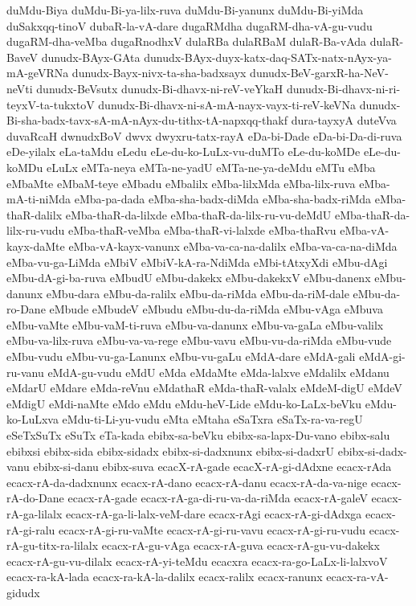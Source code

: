 {duMdu-Biya
duMdu-Bi-ya-lilx-ruva
duMdu-Bi-yanunx
duMdu-Bi-yiMda
duSakxqq-tinoV
dubaR-la-vA-dare
dugaRMdha
dugaRM-dha-vA-gu-vudu
dugaRM-dha-veMba
dugaRnodhxV
dulaRBa
dulaRBaM
dulaR-Ba-vAda
dulaR-BaveV
dunudx-BAyx-GAta
dunudx-BAyx-duyx-katx-daq-SATx-natx-nAyx-ya-mA-geVRNa
dunudx-Bayx-nivx-ta-sha-badxsayx
dunudx-BeV-garxR-ha-NeV-neVti
dunudx-BeVsutx
dunudx-Bi-dhavx-ni-reV-veYkaH
dunudx-Bi-dhavx-ni-ri-teyxV-ta-tukxtoV
dunudx-Bi-dhavx-ni-sA-mA-nayx-vayx-ti-reV-keVNa
dunudx-Bi-sha-badx-tavx-sA-mA-nAyx-du-tithx-tA-napxqq-thakf
dura-tayxyA
duteVva
duvaRcaH
dwnudxBoV
dwvx
dwyxru-tatx-rayA
eDa-bi-Dade
eDa-bi-Da-di-ruva
eDe-yilalx
eLa-taMdu
eLedu
eLe-du-ko-LuLx-vu-duMTo
eLe-du-koMDe
eLe-du-koMDu
eLuLx
eMTa-neya
eMTa-ne-yadU
eMTa-ne-ya-deMdu
eMTu
eMba
eMbaMte
eMbaM-teye
eMbadu
eMbalilx
eMba-lilxMda
eMba-lilx-ruva
eMba-mA-ti-niMda
eMba-pa-dada
eMba-sha-badx-diMda
eMba-sha-badx-riMda
eMba-thaR-dalilx
eMba-thaR-da-lilxde
eMba-thaR-da-lilx-ru-vu-deMdU
eMba-thaR-da-lilx-ru-vudu
eMba-thaR-veMba
eMba-thaR-vi-lalxde
eMba-thaRvu
eMba-vA-kayx-daMte
eMba-vA-kayx-vanunx
eMba-va-ca-na-dalilx
eMba-va-ca-na-diMda
eMba-vu-ga-LiMda
eMbiV
eMbiV-kA-ra-NdiMda
eMbi-tAtxyXdi
eMbu-dAgi
eMbu-dA-gi-ba-ruva
eMbudU
eMbu-dakekx
eMbu-dakekxV
eMbu-danenx
eMbu-danunx
eMbu-dara
eMbu-da-ralilx
eMbu-da-riMda
eMbu-da-riM-dale
eMbu-da-ro-Dane
eMbude
eMbudeV
eMbudu
eMbu-du-da-riMda
eMbu-vAga
eMbuva
eMbu-vaMte
eMbu-vaM-ti-ruva
eMbu-va-danunx
eMbu-va-gaLa
eMbu-valilx
eMbu-va-lilx-ruva
eMbu-va-va-rege
eMbu-vavu
eMbu-vu-da-riMda
eMbu-vude
eMbu-vudu
eMbu-vu-ga-Lanunx
eMbu-vu-gaLu
eMdA-dare
eMdA-gali
eMdA-gi-ru-vanu
eMdA-gu-vudu
eMdU
eMda
eMdaMte
eMda-lalxve
eMdalilx
eMdanu
eMdarU
eMdare
eMda-reVnu
eMdathaR
eMda-thaR-valalx
eMdeM-digU
eMdeV
eMdigU
eMdi-naMte
eMdo
eMdu
eMdu-heV-Lide
eMdu-ko-LaLx-beVku
eMdu-ko-LuLxva
eMdu-ti-Li-yu-vudu
eMta
eMtaha
eSaTxra
eSaTx-ra-va-regU
eSeTxSuTx
eSuTx
eTa-kada
ebibx-sa-beVku
ebibx-sa-lapx-Du-vano
ebibx-salu
ebibxsi
ebibx-sida
ebibx-sidadx
ebibx-si-dadxnunx
ebibx-si-dadxrU
ebibx-si-dadx-vanu
ebibx-si-danu
ebibx-suva
ecacX-rA-gade
ecacX-rA-gi-dAdxne
ecacx-rAda
ecacx-rA-da-dadxnunx
ecacx-rA-dano
ecacx-rA-danu
ecacx-rA-da-va-nige
ecacx-rA-do-Dane
ecacx-rA-gade
ecacx-rA-ga-di-ru-va-da-riMda
ecacx-rA-galeV
ecacx-rA-ga-lilalx
ecacx-rA-ga-li-lalx-veM-dare
ecacx-rAgi
ecacx-rA-gi-dAdxga
ecacx-rA-gi-ralu
ecacx-rA-gi-ru-vaMte
ecacx-rA-gi-ru-vavu
ecacx-rA-gi-ru-vudu
ecacx-rA-gu-titx-ra-lilalx
ecacx-rA-gu-vAga
ecacx-rA-guva
ecacx-rA-gu-vu-dakekx
ecacx-rA-gu-vu-dilalx
ecacx-rA-yi-teMdu
ecacxra
ecacx-ra-go-LaLx-li-lalxvoV
ecacx-ra-kA-lada
ecacx-ra-kA-la-dalilx
ecacx-ralilx
ecacx-ranunx
ecacx-ra-vA-gidudx
}
